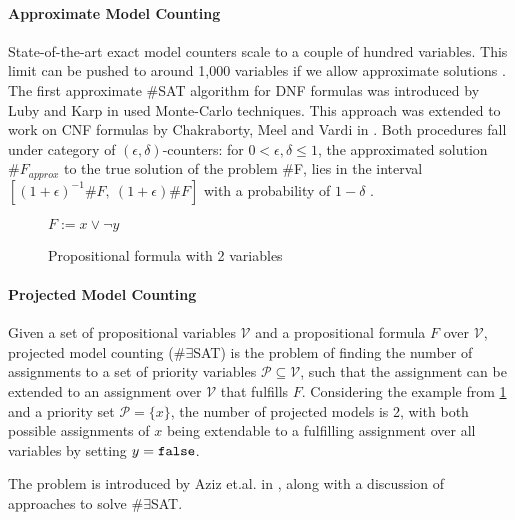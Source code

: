 \paragraph*{Approximate Model Counting}
State-of-the-art exact model counters scale to a couple of hundred variables.  This limit can be pushed to around 1,000 variables if we allow approximate solutions \cite{biere09}.
The first approximate \#SAT algorithm for DNF formulas was introduced by Luby and Karp in \cite{karp89} used Monte-Carlo techniques. This approach was extended to work on CNF formulas by Chakraborty, Meel and Vardi in \cite{chakraborty13}. Both procedures fall under category of $(\epsilon, \delta)$-counters: for $0 < \epsilon, \delta \leq 1$, the approximated solution $\#F_{approx}$ to the true solution of the problem \#F, lies in the interval $[(1 + \epsilon)^{-1} \#F, \: (1 + \epsilon) \#F]$ with a probability of $1 - \delta$ \cite{karp89,chakraborty13}.

\begin{figure}
    \centering
    $F := x \lor \lnot y$
    \caption{Propositional formula with 2 variables}
    \label{fig:satEx}
\end{figure}



\paragraph*{Projected Model Counting}
Given a set of propositional variables $\mathcal{V}$ and a propositional formula $F$ over $\mathcal{V}$, projected model counting (\#$\exists$SAT) is the problem of finding the number of assignments to a set of priority variables $\mathcal{P} \subseteq \mathcal{V}$, such that the assignment can be extended to an assignment over $\mathcal{V}$ that fulfills $F$. Considering the example from \ref{fig:satEx} and a priority set $\mathcal{P} = \{x\}$, the number of projected models is 2, with both possible assignments of $x$ being extendable to a fulfilling assignment over all variables by setting $y = \mathtt{false}$.

The problem is introduced by Aziz et.al. in \cite{aziz15}, along with a discussion of approaches to solve \#$\exists$SAT. 



